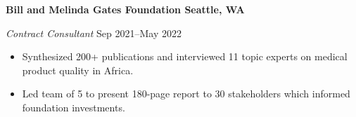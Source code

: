 \textbf{Bill and Melinda Gates Foundation \hfill Seattle, WA}\par
\textit{Contract Consultant} \hfill Sep 2021--May 2022
\begin{itemize}
	\item Synthesized 200+ publications and interviewed 11 topic experts on medical product quality in Africa.
	\item Led team of 5 to present 180-page report to 30 stakeholders which informed foundation investments.
\end{itemize}\par